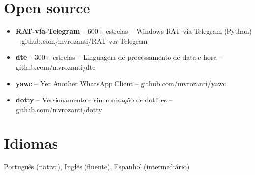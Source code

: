 \documentclass[11pt,a4paper]{article}
\begin{document}
\section{Open source}
\begin{itemize}
\item \textbf{RAT-via-Telegram} -- 600+ estrelas -- Windows RAT via Telegram (Python) -- github.com/mvrozanti/RAT-via-Telegram
\item \textbf{dte} -- 300+ estrelas -- Linguagem de processamento de data e hora -- github.com/mvrozanti/dte
\item \textbf{yawc} -- Yet Another WhatsApp Client -- github.com/mvrozanti/yawc
\item \textbf{dotty} -- Versionamento e sincronização de dotfiles -- github.com/mvrozanti/dotty
\end{itemize}

\section{Idiomas}
Português (nativo), Inglês (fluente), Espanhol (intermediário)
\end{document}

